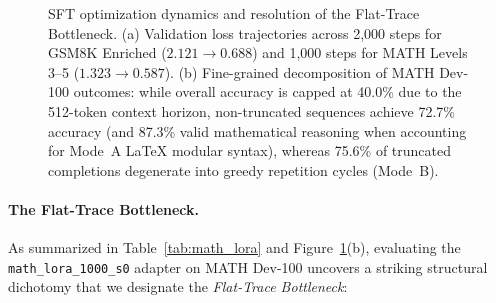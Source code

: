 \documentclass[11pt,a4paper]{article}
\begin{document}
\begin{figure}[t]
\begin{minipage}[t]{0.48\textwidth}
\begin{tikzpicture}
\end{tikzpicture}
\end{minipage}
\caption{SFT optimization dynamics and resolution of the Flat-Trace Bottleneck. (a) Validation loss trajectories across 2,000 steps for GSM8K Enriched ($2.121 \to 0.688$) and 1,000 steps for MATH Levels 3--5 ($1.323 \to 0.587$). (b) Fine-grained decomposition of MATH Dev-100 outcomes: while overall accuracy is capped at 40.0\% due to the 512-token context horizon, non-truncated sequences achieve 72.7\% accuracy (and 87.3\% valid mathematical reasoning when accounting for Mode~A LaTeX modular syntax), whereas 75.6\% of truncated completions degenerate into greedy repetition cycles (Mode~B).}
\label{fig:sft_convergence}
\end{figure}

\paragraph{The Flat-Trace Bottleneck.} As summarized in Table~\ref{tab:math_lora} and Figure~\ref{fig:sft_convergence}(b), evaluating the \texttt{math\_lora\_1000\_s0} adapter on MATH Dev-100 uncovers a striking structural dichotomy that we designate the \textit{Flat-Trace Bottleneck}:
\end{document}
